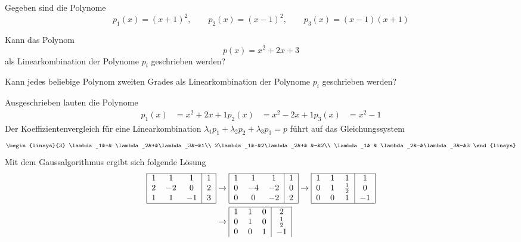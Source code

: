 Gegeben sind die Polynome
\[
p_1(x)=(x+1)^2,\qquad
p_2(x)=(x-1)^2,\qquad
p_3(x)=(x-1)(x+1)
\]
\begin{teilaufgaben}
\item
Kann das Polynom
\[
p(x)=x^2+2x+3
\]
als Linearkombination der Polynome $p_i$
geschrieben werden?
\item Kann jedes beliebige Polynom zweiten Grades als Linearkombination der
Polynome $p_i$ geschrieben werden?
\end{teilaufgaben}

\begin{loesung}
\begin{teilaufgaben}
\item
Ausgeschrieben lauten die Polynome
\begin{align*}
p_1(x)&=x^2+2x+1
p_2(x)&=x^2-2x+1
p_3(x)&=x^2-1
\end{align*}
Der Koeffizientenvergleich für eine Linearkombination
$\lambda_1p_1+\lambda_2p_2+\lambda_3p_3=p$ führt auf das
Gleichungssystem
\[
\begin{linsys}{3}
\lambda_1&+& \lambda_2&+&\lambda_3&=&1\\
2\lambda_1&-&2\lambda_2&+&         &=&2\\
\lambda_1& & \lambda_2&-&\lambda_3&=&3
\end{linsys}
\]
Mit dem Gaussalgorithmus ergibt sich folgende Lösung
\begin{align*}
\begin{tabular}{|ccc|c|}
\hline
1&1&1&1\\
2&$-2$&0&2\\
1&1&$-1$&3\\
\hline
\end{tabular}
&\rightarrow
\begin{tabular}{|ccc|c|}
\hline
1&1&1&1\\
0&$-4$&$-2$&0\\
0&0&$-2$&2\\
\hline
\end{tabular}
\rightarrow
\begin{tabular}{|ccc|c|}
\hline
1&1&1&1\\
0&1&$\frac12$&0\\
0&0&1&$-1$\\
\hline
\end{tabular}
\\
&\rightarrow
\begin{tabular}{|ccc|c|}
\hline
1&1&0&2\\
0&1&0&$\frac12$\\
0&0&1&$-1$\\

\end{tabular}
\end{align*}
\end{teilaufgaben}
\end{loesung}
